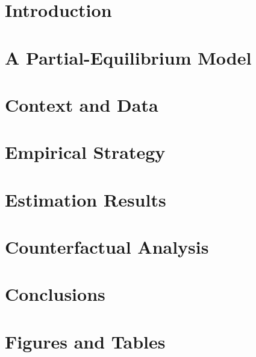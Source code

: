 \documentclass{article}
\begin{document}
\clearpage


\section{Introduction}\label{sec:intro}
    

\section{A Partial-Equilibrium Model}\label{sec:model}
    

\section{Context and Data}\label{sec:data}
    

\section{Empirical Strategy}\label{sec:empirical_strategy}
    

\section{Estimation Results}\label{sec:results}
    

\section{Counterfactual Analysis}\label{sec:counterfactual}
    

\section{Conclusions}\label{sec:conclusion}
    


\clearpage
\printbibliography


\clearpage
\section*{Figures and Tables}
\end{document}
